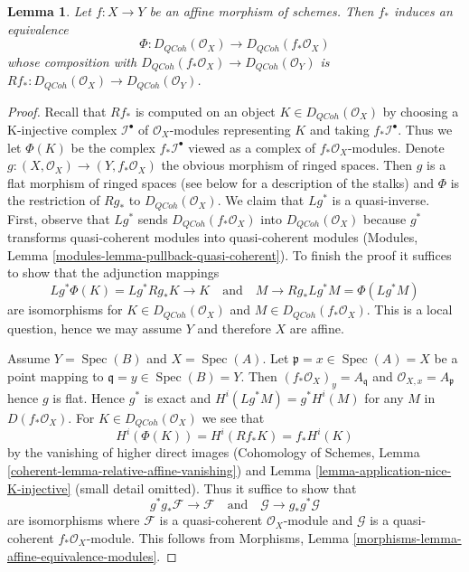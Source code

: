\documentclass{stacks-project}
\theoremstyle{plain}
\newtheorem{lemma}[subsection]{Lemma}
\theoremstyle{definition}
\theoremstyle{remark}
\numberwithin{equation}{subsection}
\def\Spec{\mathop{\mathrm{Spec}}}
\def\QCoh{\mathit{QCoh}}
\begin{document}
\begin{lemma}
\label{lemma-affine-morphism-equivalence}
Let $f : X \to Y$ be an affine morphism of schemes. Then $f_*$ induces
an equivalence
$$
\Phi : D_\QCoh(\mathcal{O}_X) \longrightarrow D_\QCoh(f_*\mathcal{O}_X)
$$
whose composition with $D_\QCoh(f_*\mathcal{O}_X) \to D_\QCoh(\mathcal{O}_Y)$
is $Rf_* : D_\QCoh(\mathcal{O}_X) \to D_\QCoh(\mathcal{O}_Y)$.
\end{lemma}

\begin{proof}
Recall that $Rf_*$ is computed on an object $K \in D_\QCoh(\mathcal{O}_X)$
by choosing a K-injective complex $\mathcal{I}^\bullet$ of
$\mathcal{O}_X$-modules representing $K$ and taking $f_*\mathcal{I}^\bullet$.
Thus we let $\Phi(K)$ be the complex $f_*\mathcal{I}^\bullet$
viewed as a complex of $f_*\mathcal{O}_X$-modules.
Denote $g : (X, \mathcal{O}_X) \to (Y, f_*\mathcal{O}_X)$ the
obvious morphism of ringed spaces. Then $g$ is a flat morphism of
ringed spaces (see below for a description of the stalks) and
$\Phi$ is the restriction of $Rg_*$ to $D_\QCoh(\mathcal{O}_X)$.
We claim that $Lg^*$ is a quasi-inverse. First, observe that
$Lg^*$ sends $D_\QCoh(f_*\mathcal{O}_X)$ into $D_\QCoh(\mathcal{O}_X)$
because $g^*$ transforms quasi-coherent modules into quasi-coherent
modules (Modules, Lemma \ref{modules-lemma-pullback-quasi-coherent}).
To finish the proof it suffices to show that
the adjunction mappings
$$
Lg^*\Phi(K) = Lg^*Rg_*K \to K
\quad\text{and}\quad
M \to Rg_*Lg^*M = \Phi(Lg^*M)
$$
are isomorphisms for $K \in D_\QCoh(\mathcal{O}_X)$ and
$M \in D_\QCoh(f_*\mathcal{O}_X)$. This is a local question, hence
we may assume $Y$ and therefore $X$ are affine.

\medskip\noindent
Assume $Y = \Spec(B)$ and $X = \Spec(A)$. Let
$\mathfrak p = x \in \Spec(A) = X$ be a point mapping to
$\mathfrak q = y \in \Spec(B) = Y$. Then
$(f_*\mathcal{O}_X)_y = A_\mathfrak q$ and $\mathcal{O}_{X, x} = A_\mathfrak p$
hence $g$ is flat. Hence $g^*$ is exact and $H^i(Lg^*M) = g^*H^i(M)$
for any $M$ in $D(f_*\mathcal{O}_X)$.
For $K \in D_\QCoh(\mathcal{O}_X)$ we see that
$$
H^i(\Phi(K)) = H^i(Rf_*K) = f_*H^i(K)
$$
by the vanishing of higher direct images
(Cohomology of Schemes, Lemma \ref{coherent-lemma-relative-affine-vanishing})
and Lemma \ref{lemma-application-nice-K-injective} (small detail omitted).
Thus it suffice to show that
$$
g^*g_*\mathcal{F} \to \mathcal{F}
\quad\text{and}\quad
\mathcal{G} \to g_*g^*\mathcal{G}
$$
are isomorphisms where $\mathcal{F}$ is
a quasi-coherent $\mathcal{O}_X$-module and $\mathcal{G}$ is
a quasi-coherent $f_*\mathcal{O}_X$-module. This follows from
Morphisms, Lemma \ref{morphisms-lemma-affine-equivalence-modules}.
\end{proof}
\end{document}
